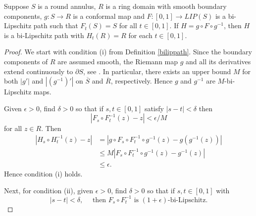 \documentclass{amsart}
\begin{document}
\begin{proposition}
\label{prop:path}
Suppose $S$ is a round annulus, $R$ is a ring domain with smooth boundary components, $g:S\to R$ is a conformal map and $F:[0,1] \to LIP(S)$ is a bi-Lipschitz path such that $F_t(S)= S$ for all $t\in [0,1]$. If $H = g \circ F \circ g^{-1}$, then $H$ is a bi-Lipschitz path with $H_t(R) = R$ for each $t \in [0,1]$.
\end{proposition}

\begin{proof}
We start with condition (i) from Definition \ref{bilippath}. 
Since the boundary components of $R$ are assumed smooth, the Riemann map $g$ and all its derivatives extend continuously to $\partial S$, see \cite[p.24]{BeKr}. In particular, there exists an upper bound $M$ for both $|g'|$ and $|(g^{-1})'|$ on $\overline{S}$ and $\overline{R}$, respectively. Hence $g$ and $g^{-1}$ are $M$-bi-Lipschitz maps.

Given $\epsilon >0$, find $\delta >0$ so that if $s,t \in [0,1]$ satisfy $|s-t| <\delta$ then 
\[ |F_s \circ F_t^{-1}(z) - z | < \epsilon / M\] 
for all $z \in R$. Then
\begin{align*}
|H_s \circ H_t^{-1}(z) - z | &= |g\circ F_s \circ F_t^{-1} \circ g^{-1}(z) - g(g^{-1}(z)) | \\
& \leq M |F_s \circ F_t^{-1} \circ g^{-1}(z) - g^{-1}(z) | \\
& \leq \epsilon.
\end{align*}
Hence condition (i) holds.

Next, for condition (ii), given $\epsilon >0$, find $\delta >0$ so that if $s,t \in [0,1]$ with 
\begin{equation}
\label{eq:path9}
|s-t| <\delta, \quad \text{ then } F_s\circ F_t^{-1} \text{ is $(1+\epsilon)$-bi-Lipschitz.}
\end{equation}


\end{proof}
\end{document}

